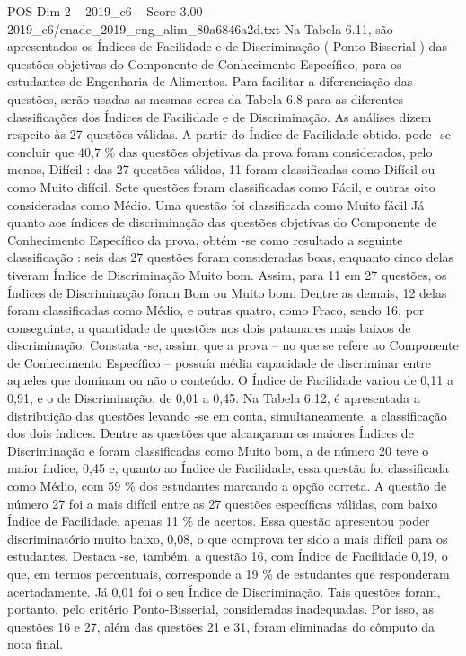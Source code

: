 \begin{textsample}{POS Dim 2 – 2019\_c6 – Score 3.00 – 2019\_c6/enade\_2019\_eng\_alim\_80a6846a2d.txt}
Na Tabela 6.11, são apresentados os Índices de Facilidade e de Discriminação ( Ponto-Bisserial ) das questões objetivas do Componente de Conhecimento Específico, para os estudantes de Engenharia de Alimentos.
Para facilitar a diferenciação das questões, serão usadas as mesmas cores da Tabela 6.8 para as diferentes classificações dos Índices de Facilidade e de Discriminação.
As análises dizem respeito às 27 questões válidas.
A partir do Índice de Facilidade obtido, pode -se concluir que 40,7 \% das questões objetivas da prova foram considerados, pelo menos, Difícil : das 27 questões válidas, 11 foram classificadas como Difícil ou como Muito difícil.
Sete questões foram classificadas como Fácil, e outras oito consideradas como Médio.
Uma questão foi classificada como Muito fácil Já quanto aos índices de discriminação das questões objetivas do Componente de Conhecimento Específico da prova, obtém -se como resultado a seguinte classificação : seis das 27 questões foram consideradas boas, enquanto cinco delas tiveram Índice de Discriminação Muito bom.
Assim, para 11 em 27 questões, os Índices de Discriminação foram Bom ou Muito bom.
Dentre as demais, 12 delas foram classificadas como Médio, e outras quatro, como Fraco, sendo 16, por conseguinte, a quantidade de questões nos dois patamares mais baixos de discriminação.
Constata -se, assim, que a prova – no que se refere ao Componente de Conhecimento Específico – possuía média capacidade de discriminar entre aqueles que dominam ou não o conteúdo.
O Índice de Facilidade variou de 0,11 a 0,91, e o de Discriminação, de 0,01 a 0,45.
Na Tabela 6.12, é apresentada a distribuição das questões levando -se em conta, simultaneamente, a classificação dos dois índices.
Dentre as questões que alcançaram os maiores Índices de Discriminação e foram classificadas como Muito bom, a de número 20 teve o maior índice, 0,45 e, quanto ao Índice de Facilidade, essa questão foi classificada como Médio, com 59 \% dos estudantes marcando a opção correta.
A questão de número 27 foi a mais difícil entre as 27 questões específicas válidas, com baixo Índice de Facilidade, apenas 11 \% de acertos.
Essa questão apresentou poder discriminatório muito baixo, 0,08, o que comprova ter sido a mais difícil para os estudantes.
Destaca -se, também, a questão 16, com Índice de Facilidade 0,19, o que, em termos percentuais, corresponde a 19 \% de estudantes que responderam acertadamente.
Já 0,01 foi o seu Índice de Discriminação.
Tais questões foram, portanto, pelo critério Ponto-Bisserial, consideradas inadequadas.
Por isso, as questões 16 e 27, além das questões 21 e 31, foram eliminadas do cômputo da nota final.

\end{textsample}
